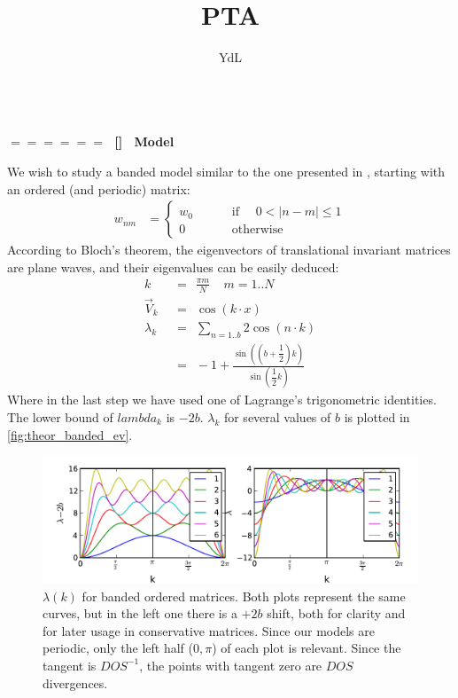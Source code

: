 \documentclass[onecolumn,fleqn,longbibliography]{revtex4}
\newcommand{\sect}[1]
{
\addtocounter{section}{1} 
\setcounter{subsection}{0}
\ \\ 
\pdfbookmark[2]{\thesection. \ #1}{sect.\thesection}
{\Large\bf $=\!=\!=\!=\!=\!=\;$ [\thesection] \ #1}  
\nopagebreak
}
\begin{document}
\title{PTA}

\author{YdL}

\maketitle



\sect{Model}

We wish to study a banded model similar to the one presented in \cite{bodyfelt_scaling_2013},
starting with an ordered (and periodic) matrix:
%
\begin{align}
w_{nm} &= \begin{cases}
  w_0 &\qquad \textrm{ if  } \quad 0<|n-m|\le 1 \\
  0 &\qquad \textrm{ otherwise}
\end{cases}
\end{align}
%
According to Bloch's theorem, the eigenvectors of translational invariant
matrices are plane waves, and their eigenvalues can be easily deduced:
\begin{align}
k\ \  &=\ \  \frac{\pi m}{N} \ \ \ \ \ m=1..N \\
\vec{V}_k\ \  &=\ \  \cos(k\cdot x)\\
\lambda_k\ \  &=\ \  \sum_{n=1..b} 2\cos(n\cdot k) \\
&= \ \ -1 + \frac{\sin((b+\dfrac{1}{2})k)}{\sin(\dfrac{1}{2}k)}
\end{align}  
Where in the last step we have used one of Lagrange's trigonometric identities. 
The lower bound of $lambda_k$ is $-2b$. 
$\lambda_k$ for several values of $b$ is plotted in \autoref{fig:theor_banded_ev}.

\begin{figure}[H]
    \includegraphics{pta_theor_banded_ev}
    \caption{$\lambda(k)$ for banded ordered matrices. Both plots
    represent the same curves, but in the left one there is a $+2b$ shift, both for clarity 
    and for later usage in conservative matrices. Since our 
    models are periodic, only the left half ($0,\pi$) of each plot is relevant. Since 
    the tangent is $DOS^{-1}$, the points with tangent zero are $DOS$ divergences.
    }
    \label{fig:theor_banded_ev}
\end{figure}
\end{document}
